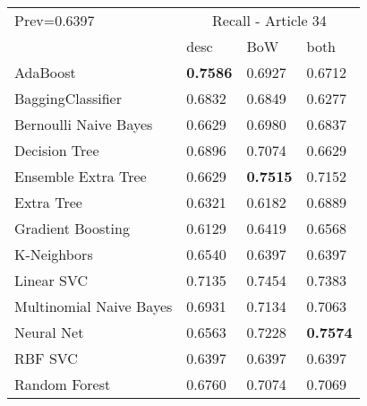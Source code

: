 \begin{tabular}{|l|l|l|l| }
\hline
Prev=0.6397 &  \multicolumn{3}{c|}{Recall - Article 34} \\
\cline{2-4} & desc & BoW & both \\ \hline
AdaBoost                & {\bf 0.7586} & 0.6927 & 0.6712\\
BaggingClassifier       & 0.6832 & 0.6849 & 0.6277\\
Bernoulli Naive Bayes   & 0.6629 & 0.6980 & 0.6837\\
Decision Tree           & 0.6896 & 0.7074 & 0.6629\\
Ensemble Extra Tree     & 0.6629 & {\bf 0.7515} & 0.7152\\
Extra Tree              & 0.6321 & 0.6182 & 0.6889\\
Gradient Boosting       & 0.6129 & 0.6419 & 0.6568\\
K-Neighbors             & 0.6540 & 0.6397 & 0.6397\\
Linear SVC              & 0.7135 & 0.7454 & 0.7383\\
Multinomial Naive Bayes & 0.6931 & 0.7134 & 0.7063\\
Neural Net              & 0.6563 & 0.7228 & {\bf 0.7574}\\
RBF SVC                 & 0.6397 & 0.6397 & 0.6397\\
Random Forest           & 0.6760 & 0.7074 & 0.7069\\
\hline
\end{tabular}